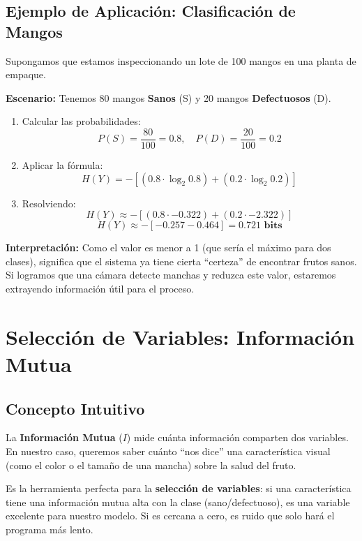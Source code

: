 \documentclass{article}
\begin{document}
\subsection{Ejemplo de Aplicación: Clasificación de Mangos}
Supongamos que estamos inspeccionando un lote de 100 mangos en una planta de empaque.

\textbf{Escenario:} Tenemos 80 mangos \textbf{Sanos} (S) y 20 mangos \textbf{Defectuosos} (D).
\begin{enumerate}
    \item Calcular las probabilidades:
    \[ P(S) = \frac{80}{100} = 0.8, \quad P(D) = \frac{20}{100} = 0.2 \]

    \item Aplicar la fórmula:
    \[ H(Y) = - [ (0.8 \cdot \log_2 0.8) + (0.2 \cdot \log_2 0.2) ] \]

    \item Resolviendo:
    \[ H(Y) \approx - [ (0.8 \cdot -0.322) + (0.2 \cdot -2.322) ] \]
    \[ H(Y) \approx - [ -0.257 - 0.464 ] = \mathbf{0.721 \text{ bits}} \]
\end{enumerate}

\textbf{Interpretación:} Como el valor es menor a 1 (que sería el máximo para dos clases), significa que el sistema ya tiene cierta ``certeza'' de encontrar frutos sanos. Si logramos que una cámara detecte manchas y reduzca este valor, estaremos extrayendo información útil para el proceso.


\section{Selección de Variables: Información Mutua}

\subsection{Concepto Intuitivo}
La \textbf{Información Mutua} ($I$) mide cuánta información comparten dos variables. En nuestro caso, queremos saber cuánto ``nos dice'' una característica visual (como el color o el tamaño de una mancha) sobre la salud del fruto.

Es la herramienta perfecta para la \textbf{selección de variables}: si una característica tiene una información mutua alta con la clase (sano/defectuoso), es una variable excelente para nuestro modelo. Si es cercana a cero, es ruido que solo hará el programa más lento.
\end{document}
